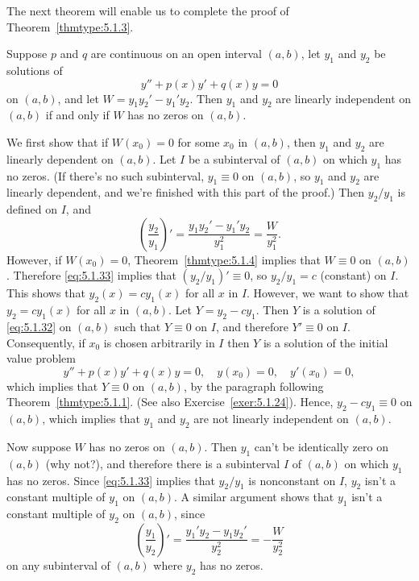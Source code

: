The next theorem will enable us to complete the proof of Theorem~\ref{thmtype:5.1.3}.

\begin{theorem}
  \color{blue}
  \label{thmtype:5.1.5} Suppose $p$ and $q$ are continuous on an open interval $(a,b)$, let $y_{1}$
  and $y_{2}$ be solutions of
  \begin{equation}
    \label{eq:5.1.32}y''+p(x)y'+q(x)y=0
  \end{equation}
  on $(a,b)$, and let $W=y_{1}y_{2}'-y_{1}'y_{2}$. Then $y_{1}$ and $y_{2}$ are linearly independent
  on $(a,b)$ if and only if $W$ has no zeros on $(a,b)$.
\end{theorem}

\proof We first show that if $W(x_{0})=0$ for some $x_{0}$ in $(a,b)$, then $y_{1}$ and $y_{2}$ are
linearly dependent on $(a,b)$. Let $I$ be a subinterval of $(a,b)$ on which $y_{1}$ has no zeros.
(If there's no such subinterval, $y_{1}\equiv0$ on $(a,b)$, so $y_{1}$ and $y_{2}$ are linearly
dependent, and we're finished with this part of the proof.) Then $y_{2}/y_{1}$ is defined on $I$,
and
\begin{equation}
  \label{eq:5.1.33}\left(\frac{y_{2}}{y_{1}}\right)'=\frac{y_{1}y_{2}'-y_{1}'y_{2}}{y_{1}^{2}}=\frac{W}{y_{1}^{2}}.
\end{equation}
However, if $W(x_{0})=0$, Theorem~\ref{thmtype:5.1.4} implies that $W\equiv0$ on $(a,b)$. Therefore
\eqref{eq:5.1.33} implies that $(y_{2}/y_{1})'\equiv0$, so $y_{2}/y_{1}=c$ (constant) on $I$. This
shows that $y_{2}(x)=cy_{1}(x)$ for all $x$ in $I$. However, we want to show that $y_{2}=cy_{1}(x)$
for all $x$ in $(a,b)$. Let $Y=y_{2}-cy_{1}$. Then $Y$ is a solution of \eqref{eq:5.1.32} on $(a,b)$
such that $Y\equiv0$ on $I$, and therefore $Y'\equiv0$ on $I$. Consequently, if $x_{0}$ is chosen
arbitrarily in $I$ then $Y$ is a solution of the initial value problem
\[
  y''+p(x)y'+q(x)y=0,\quad y(x_{0})=0,\quad y'(x_{0})=0,
\]
which implies that $Y\equiv0$ on $(a,b)$, by the paragraph following Theorem~\ref{thmtype:5.1.1}.
(See also Exercise~\ref{exer:5.1.24}). Hence, $y_{2}-cy_{1}\equiv0$ on $(a,b)$, which implies that
$y_{1}$ and $y_{2}$ are not linearly independent on $(a,b)$.

Now suppose $W$ has no zeros on $(a,b)$. Then $y_{1}$ can't be identically zero on $(a,b)$ (why
not?), and therefore there is a subinterval $I$ of $(a,b)$ on which $y_{1}$ has no zeros. Since
\eqref{eq:5.1.33} implies that $y_{2}/y_{1}$ is nonconstant on $I$, $y_{2}$ isn't a constant
multiple of $y_{1}$ on $(a,b)$. A similar argument shows that $y_{1}$ isn't a constant multiple of
$y_{2}$ on $(a,b)$, since
\[
  \left(\frac{y_{1}}{y_{2}}\right)'=\frac{y_{1}'y_{2}-y_{1}y_{2}'}{y_{2}^{2}}=-\frac{W}{y_{2}^{2}}
\]
on any subinterval of $(a,b)$ where $y_{2}$ has no zeros. \bbox

